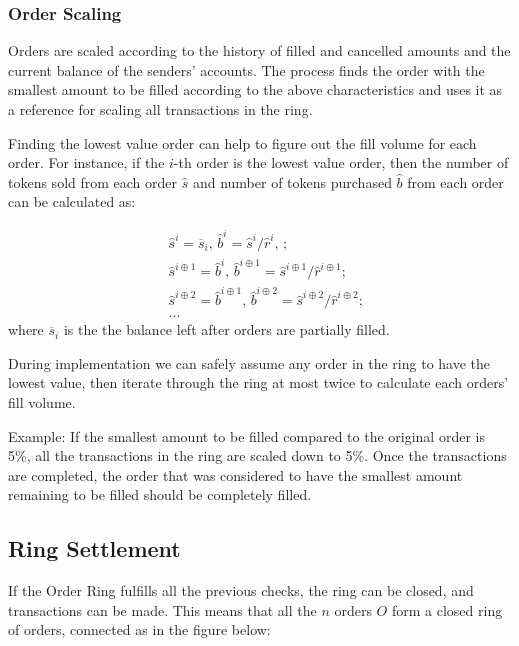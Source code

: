 \documentclass[UTF8,nofonts]{article}
\begin{document}
\begin{multicols}{2}
\subsubsection{Order Scaling\label{sec:order_scaling}}
Orders are scaled according to the history of filled and cancelled amounts and the current balance of the senders' accounts. The process finds the order with the smallest amount to be filled according to the above characteristics and uses it as a reference for scaling all transactions in the ring.


Finding the lowest value order can help to figure out the fill volume for each order. For instance, if the $i$-th order is the lowest value order, then the number of tokens sold from each order $\hat{s}$ and number of tokens purchased $\hat{b}$ from each order can be calculated as:

\[
\begin{split}
&\hat{s}^{i}=\overline{s}_i\text{, } \hat{b}^{i}=\hat{s}^{i}/ \hat{r}^i\text{, }\text{;}\\
&\hat{s}^{i\oplus 1}=\hat{b}^i\text{, } \hat{b}^{i\oplus 1}=\hat{s}^{i\oplus 1}/ \hat{r}^{i\oplus 1}\text{;}\\
&\hat{s}^{i\oplus 2}=\hat{b}^{i\oplus 1}\text{, } \hat{b}^{i\oplus 2}=\hat{s}^{i\oplus 2}/ \hat{r}^{i\oplus 2}\text{;}\\
& ...
\end{split}
\]
where $\overline{s}_i$ is the the balance left after orders are partially filled.

During implementation we can safely assume any order in the ring to have the lowest value, then iterate through the ring at most twice to calculate each orders' fill volume. 

Example: If the smallest amount to be filled compared to the original order is 5\%, all the transactions in the ring are scaled down to 5\%. Once the transactions are completed, the order that was considered to have the smallest amount remaining to be filled should be completely filled.

\subsection{Ring Settlement\label{sec:settlement}}

If the Order Ring fulfills all the previous checks, the ring can be closed, and transactions can be made. This means that all the $n$ orders $O$ form a closed ring of orders, connected as in the figure below:


\end{multicols}
\end{document}
